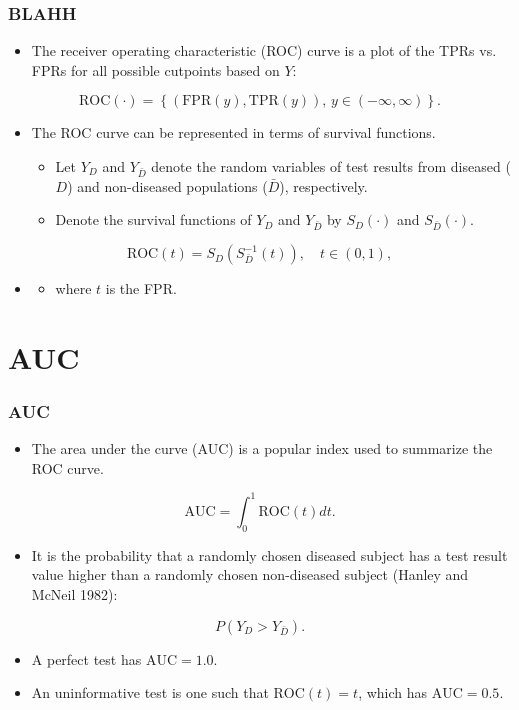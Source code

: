 \documentclass[t]{beamer}
\begin{document}
\begin{frame}
\frametitle{BLAHH}
\begin{itemize}
\item The receiver operating characteristic (ROC) curve is a plot of the TPRs vs. FPRs for all possible cutpoints based on $Y$:
\end{itemize}
$$\text{ROC}(\cdot) = \left\{(\text{FPR}(y), \text{TPR}(y)), \, y \in (-\infty, \infty) \right\}.$$
\vspace{-.2in}
\begin{itemize}
    \item The ROC curve can be represented in terms of survival functions.
    \begin{itemize}
        \item Let $Y_D$ and $Y_{\bar{D}}$ denote the random variables of test results from diseased ($D$) and non-diseased populations ($\bar{D}$),  respectively.
        \item Denote the survival functions of $Y_D$ and $Y_{\bar{D}}$ by $S_D(\cdot)$ and $S_{\bar{D}}(\cdot)$.
    \end{itemize}
\end{itemize}
$$\text{ROC}(t) = S_D(S_{\bar{D}}^{-1}(t)), \quad t \in (0, 1),$$
\vspace{-.2in}
\begin{itemize}
    \item[]
\begin{itemize}
    \item[] where $t$ is the FPR.
\end{itemize}
\end{itemize}
\end{frame}

\section{AUC}

\begin{frame}
\frametitle{AUC}
\begin{itemize}
\item The area under the curve (AUC) is a popular index used to summarize the ROC curve.
\end{itemize}
$$\text{AUC} = \int_0^1\text{ROC}(t)dt.$$
\begin{itemize}
\item It is the probability that a randomly chosen diseased subject has a test result value higher than a randomly chosen non-diseased subject (Hanley and McNeil 1982):
\end{itemize}
$$P(Y_D > Y_{\bar{D}}).$$
\vspace{-.2in}
\begin{itemize}
\item A perfect test has $\text{AUC} = 1.0$.
\item An uninformative test is one such that $\text{ROC}(t) = t$, which has $\text{AUC} = 0.5$.
\end{itemize}
\end{frame}
\end{document}

